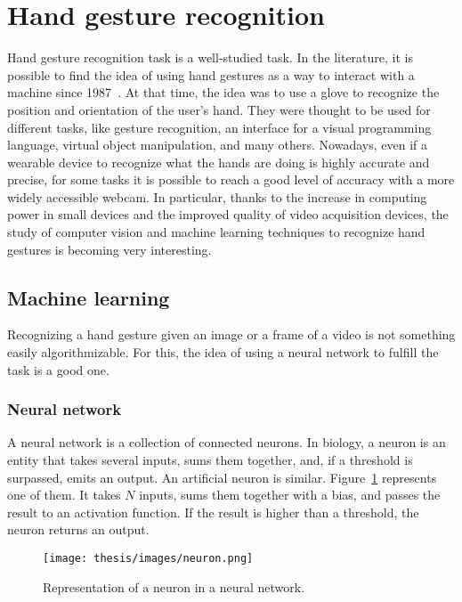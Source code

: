 \documentclass[../thesis.tex]{subfiles}
\begin{document}
\section{Hand gesture recognition}
Hand gesture recognition task is a well-studied task. In the literature, it is possible to find the idea of using hand gestures as a way to interact with a machine since 1987~\cite{paper:hand_gesture_interface_device}. At that time, the idea was to use a glove to recognize the position and orientation of the user’s hand. They were thought to be used for different tasks, like gesture recognition, an interface for a visual programming language, virtual object manipulation, and many others. Nowadays, even if a wearable device to recognize what the hands are doing is highly accurate and precise, for some tasks it is possible to reach a good level of accuracy with a more widely accessible webcam. In particular, thanks to the increase in computing power in small devices and the improved quality of video acquisition devices, the study of computer vision and machine learning techniques to recognize hand gestures is becoming very interesting.

\subsection{Machine learning}
Recognizing a hand gesture given an image or a frame of a video is not something easily algorithmizable. For this, the idea of using a neural network to fulfill the task is a good one.

\subsubsection{Neural network}
A neural network is a collection of connected neurons. In biology, a neuron is an entity that takes several inputs, sums them together, and, if a threshold is surpassed, emits an output. An artificial neuron is similar. Figure~\ref{fig:neuron} represents one of them. It takes $N$ inputs, sums them together with a bias, and passes the result to an activation function. If the result is higher than a threshold, the neuron returns an output.

\begin{figure}[H]
    \centering
    \texttt{[image: thesis/images/neuron.png]}
    \caption{Representation of a neuron in a neural network.}
    \label{fig:neuron}
\end{figure}
\end{document}
